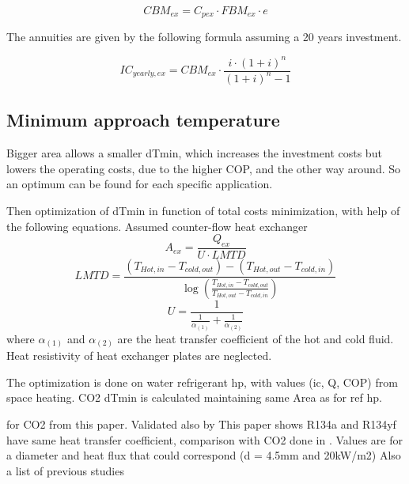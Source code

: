 \documentclass{article}
\begin{document}
\begin{equation}
CBM_{ex} = C_{pex} \cdot FBM_{ex} \cdot e 
\end{equation}

The annuities are given by the following formula assuming a 20 years investment. 

\begin{equation}
IC_{yearly,ex} = CBM_{ex} \cdot \frac{i \cdot (1 + i)^n}{(1 + i)^n - 1} 
\end{equation}

\subsection{Minimum approach temperature}
Bigger area allows a smaller dTmin, which increases the investment costs but lowers the operating costs, due to the higher COP, and the other way around. So an optimum can be found for each specific application.

Then optimization of dTmin in function of total costs minimization, with help of the following equations. Assumed counter-flow heat exchanger 
\begin{equation}\label{eq:HEX_area}
    A_{ex} = \frac{Q_{ex}}{U \cdot LMTD}
\end{equation}
\begin{equation}\label{eq:LMTD}
    LMTD= \frac{(T_{Hot,in } - T_{cold,out }) - (T_{Hot,out } - T_{cold,in }) }{ \log{ (\frac{T_{Hot,in } - T_{cold,out }}{T_{Hot,out } - T_{cold,in }} ) }}
\end{equation}
\begin{equation}\label{eq:alpha}
    U= \frac{1}{ \frac{1}{\alpha_{(1)} } + \frac{1}{\alpha_{(2)}} }
\end{equation}
where $\alpha_{(1)}$ and $\alpha_{(2)}$ are the heat transfer coefficient of the hot and cold fluid. Heat resistivity of heat exchanger plates are neglected.

The optimization is done on water refrigerant hp, with values (ic, Q, COP) from space heating. 
CO2 dTmin is calculated maintaining same Area as for ref hp.

for CO2 from this paper\cite{ohFlowBoilingHeat2011}.
Validated also by 
This paper shows R134a and R134yf have same heat transfer coefficient\cite{wangOverviewHeatTransfer2013}, comparison with CO2 done in \cite{mastrulloComparisonR744R134a2009}.
Values are for a diameter and heat flux that could correspond (d = 4.5mm and 20kW/m2)
Also a list of previous studies


\end{document}
